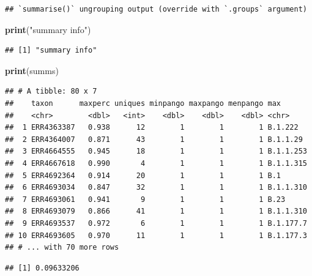 \documentclass[
]{article}
\newenvironment{Shaded}{\begin{snugshade}}{\end{snugshade}}
\newcommand{\DecValTok}[1]{\textcolor[rgb]{0.00,0.00,0.81}{#1}}
\newcommand{\KeywordTok}[1]{\textcolor[rgb]{0.13,0.29,0.53}{\textbf{#1}}}
\newcommand{\NormalTok}[1]{#1}
\newcommand{\OperatorTok}[1]{\textcolor[rgb]{0.81,0.36,0.00}{\textbf{#1}}}
\newcommand{\StringTok}[1]{\textcolor[rgb]{0.31,0.60,0.02}{#1}}
\begin{document}
\begin{verbatim}
## `summarise()` ungrouping output (override with `.groups` argument)
\end{verbatim}

\begin{Shaded}
\begin{Highlighting}[]
\KeywordTok{print}\NormalTok{(}\StringTok{"summary info"}\NormalTok{)}
\end{Highlighting}
\end{Shaded}

\begin{verbatim}
## [1] "summary info"
\end{verbatim}

\begin{Shaded}
\begin{Highlighting}[]
\KeywordTok{print}\NormalTok{(summs)}
\end{Highlighting}
\end{Shaded}

\begin{verbatim}
## # A tibble: 80 x 7
##    taxon      maxperc uniques minpango maxpango menpango max      
##    <chr>        <dbl>   <int>    <dbl>    <dbl>    <dbl> <chr>    
##  1 ERR4363387   0.938      12        1        1        1 B.1.222  
##  2 ERR4364007   0.871      43        1        1        1 B.1.1.29 
##  3 ERR4664555   0.945      18        1        1        1 B.1.1.253
##  4 ERR4667618   0.990       4        1        1        1 B.1.1.315
##  5 ERR4692364   0.914      20        1        1        1 B.1      
##  6 ERR4693034   0.847      32        1        1        1 B.1.1.310
##  7 ERR4693061   0.941       9        1        1        1 B.23     
##  8 ERR4693079   0.866      41        1        1        1 B.1.1.310
##  9 ERR4693537   0.972       6        1        1        1 B.1.177.7
## 10 ERR4693605   0.970      11        1        1        1 B.1.177.3
## # ... with 70 more rows
\end{verbatim}

\begin{Shaded}
\end{Shaded}

\begin{verbatim}
## [1] 0.09633206
\end{verbatim}
\end{document}
